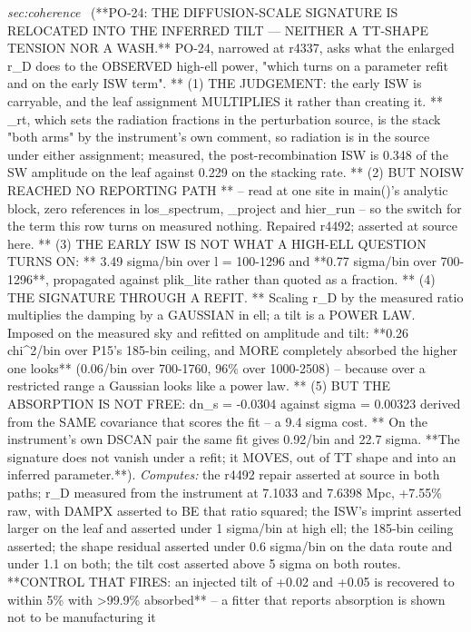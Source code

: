 \begin{description}
\textit{sec:coherence} \ (**PO-24: THE DIFFUSION-SCALE SIGNATURE IS RELOCATED INTO THE INFERRED TILT --- NEITHER A TT-SHAPE TENSION NOR A WASH.** PO-24, narrowed at r4337, asks what the enlarged r\_D does to the OBSERVED high-ell power, "which turns on a parameter refit and on the early ISW term". ** (1) THE JUDGEMENT: the early ISW is carryable, and the leaf assignment MULTIPLIES it rather than creating it. ** \_rt, which sets the radiation fractions in the perturbation source, is the stack "both arms" by the instrument's own comment, so radiation is in the source under either assignment; measured, the post-recombination ISW is 0.348 of the SW amplitude on the leaf against 0.229 on the stacking rate. ** (2) BUT NOISW REACHED NO REPORTING PATH ** -- read at one site in main()'s analytic block, zero references in los\_spectrum, \_project and hier\_run -- so the switch for the term this row turns on measured nothing. Repaired r4492; asserted at source here. ** (3) THE EARLY ISW IS NOT WHAT A HIGH-ELL QUESTION TURNS ON: ** 3.49 sigma/bin over l = 100-1296 and **0.77 sigma/bin over 700-1296**, propagated against plik\_lite rather than quoted as a fraction. ** (4) THE SIGNATURE THROUGH A REFIT. ** Scaling r\_D by the measured ratio multiplies the damping by a GAUSSIAN in ell; a tilt is a POWER LAW. Imposed on the measured sky and refitted on amplitude and tilt: **0.26 chi\textasciicircum{}2/bin over P15's 185-bin ceiling, and MORE completely absorbed the higher one looks** (0.06/bin over 700-1760, 96\% over 1000-2508) -- because over a restricted range a Gaussian looks like a power law. ** (5) BUT THE ABSORPTION IS NOT FREE: dn\_s = -0.0304 against sigma = 0.00323 derived from the SAME covariance that scores the fit -- a 9.4 sigma cost. ** On the instrument's own DSCAN pair the same fit gives 0.92/bin and 22.7 sigma. **The signature does not vanish under a refit; it MOVES, out of TT shape and into an inferred parameter.**). 
\emph{Computes:} the r4492 repair asserted at source in both paths; r\_D measured from the instrument at 7.1033 and 7.6398 Mpc, +7.55\% raw, with DAMPX asserted to BE that ratio squared; the ISW's imprint asserted larger on the leaf and asserted under 1 sigma/bin at high ell; the 185-bin ceiling asserted; the shape residual asserted under 0.6 sigma/bin on the data route and under 1.1 on both; the tilt cost asserted above 5 sigma on both routes. **CONTROL THAT FIRES: an injected tilt of +0.02 and +0.05 is recovered to within 5\% with >99.9\% absorbed** -- a fitter that reports absorption is shown not to be manufacturing it

\end{description}
